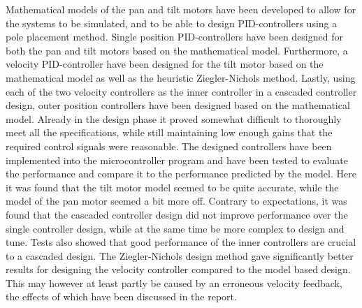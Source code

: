 \documentclass[../../main.tex]{subfiles}
\begin{document}
Mathematical models of the pan and tilt motors have been developed to allow for the systems to be simulated, and to be able to design PID-controllers using a pole placement method.
Single position PID-controllers have been designed for both the pan and tilt motors based on the mathematical model. Furthermore, a velocity PID-controller have been designed for the tilt motor based on the mathematical model as well as the heuristic Ziegler-Nichols method. Lastly, using each of the two velocity controllers as the inner controller in a cascaded controller design, outer position controllers have been designed based on the mathematical model. Already in the design phase it proved somewhat difficult to thoroughly meet all the specifications, while still maintaining low enough gains that the required control signals were reasonable.
The designed controllers have been implemented into the microcontroller program and have been tested to evaluate the performance and compare it to the performance predicted by the model.
Here it was found that the tilt motor model seemed to be quite accurate, while the model of the pan motor seemed a bit more off.
Contrary to expectations, it was found that the cascaded controller design did not improve performance over the single controller design, while at the same time be more complex to design and tune. Tests also showed that good performance of the inner controllers are crucial to a cascaded design. The Ziegler-Nichols design method gave significantly better results for designing the velocity controller compared to the model based design. This may however at least partly be caused by an erroneous velocity feedback, the effects of which have been discussed in the report.

\end{document}
